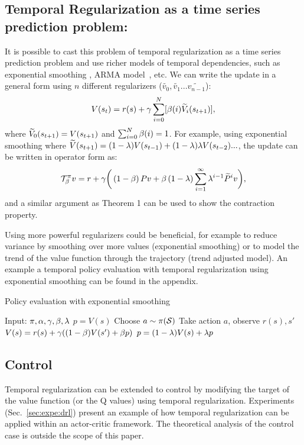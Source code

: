 \subsection{Temporal Regularization as a time series prediction problem:}
It is possible to cast this problem of temporal regularization as a time series prediction problem and use richer models of temporal dependencies, such as exponential smoothing \cite{gardner2006exponential}, ARMA model~\cite{box94}, etc. We can write the update in a general form using $n$ different regularizers ($\widetilde{v_0},\widetilde{v_1}...\widetilde{v_{n-1}}$):
\begin{equation}
    V(s_t) = r(s) + \gamma \sum_{i=0}^N [\beta(i) \widetilde{V}_i(s_{t+1})],
\end{equation}
where $\widetilde{V}_0(s_{t+1}) = V(s_{t+1})$ and $\sum_{i=0}^N \beta(i) = 1$. For example, using exponential smoothing where $\widetilde{V}(s_{t+1}) = (1-\lambda) V(s_{t-1}) + (1-\lambda)\lambda V(s_{t-2})...$, the update can be written in operator form as:
\begin{equation}
    \mathcal{T}^{\pi}_{\beta} v = r + \gamma \bigg(\left(1-\beta\right) Pv + \beta \left(1-\lambda\right) \sum_{i=1}^{\infty} \lambda^{i-1} \widetilde{P}^i v\bigg),
\end{equation}
and a similar argument as Theorem 1 can be used to show the contraction property.

Using more powerful regularizers could be beneficial, for example to reduce variance by smoothing over more values (exponential smoothing) or to model the trend of the value function through the trajectory (trend adjusted model). An example a temporal policy evaluation with temporal regularization using exponential smoothing can be found in the appendix.
\begin{algorithm}[H]
\caption{Policy evaluation with exponential smoothing}
\begin{algorithmic}[1]
    \STATE Input: $\pi,\alpha,\gamma,\beta,\lambda$
    \STATE $p = V(s)$
        \STATE Choose $a \sim \pi(\mathcal{S})$
        \STATE Take action $a$, observe $r(s),s'$
        \STATE $V(s) =  r(s) + \gamma ( (1-\beta) V(s') + \beta p) $
        \STATE $p = (1-\lambda)V(s) + \lambda p$
    \ENDFOR
\end{algorithmic}
\label{alg:pol_eval_exp_smoothing}
\end{algorithm}
\subsection{Control} 
Temporal regularization can be extended to control by  modifying the target of the value function (or the Q values) using temporal regularization. Experiments (Sec.~\ref{sec:expe:drl}) present an example of how temporal regularization can be applied within an actor-critic framework. The theoretical analysis of the control case is outside the scope of this paper.


